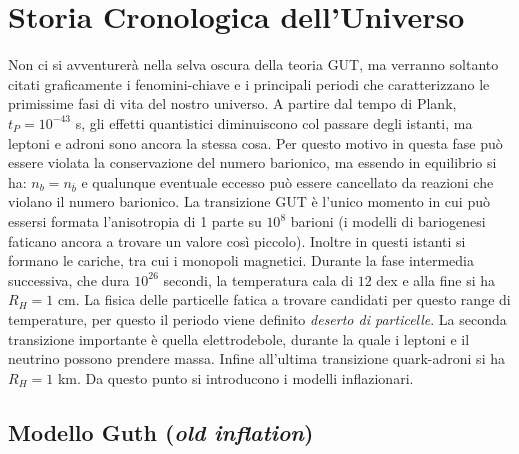 \chapter{Storia Cronologica dell'Universo}\label{5:ch}



Non ci si avventurerà nella selva oscura della teoria GUT, ma verranno soltanto citati graficamente i fenomini-chiave e i principali periodi che caratterizzano le primissime fasi di vita del nostro universo. A partire dal tempo di Plank, $t_P=10^{-43}$ s, gli effetti quantistici diminuiscono col passare degli istanti, ma leptoni e adroni sono ancora la stessa cosa. Per questo motivo in questa fase può essere violata la conservazione del numero barionico, ma essendo in equilibrio si ha: $n_b = n_{\overbar{b}}$ e qualunque eventuale eccesso può essere cancellato da reazioni che violano il numero barionico. La transizione GUT è l'unico momento in cui può essersi formata l'anisotropia di 1 parte su $10^8$ barioni (i modelli di bariogenesi faticano ancora a trovare un valore così piccolo). Inoltre in questi istanti si formano le cariche, tra cui i monopoli magnetici. Durante la fase intermedia successiva, che dura $10^{26}$ secondi, la temperatura cala di $12$ dex e alla fine si ha $R_H = 1$ cm. La fisica delle particelle fatica a trovare candidati per questo range di temperature, per questo il periodo viene definito \textit{deserto di particelle}. La seconda transizione importante è quella elettrodebole, durante la quale i leptoni e il neutrino possono prendere massa. Infine all'ultima transizione quark-adroni si ha $R_H = 1$ km. Da questo punto si introducono i modelli inflazionari.

\section{Modello Guth (\textit{old inflation})}